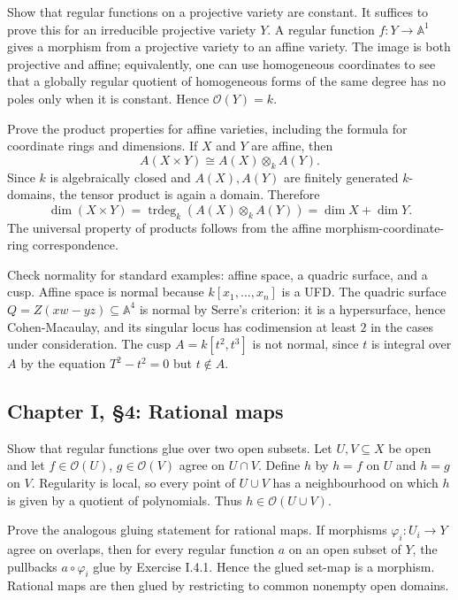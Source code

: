 \documentclass[12pt]{article}
\theoremstyle{plain}
\theoremstyle{definition}
\newcommand{\bb}[1]{\mathbb{#1}}
\begin{document}
\questionpar Show that regular functions on a projective variety are constant.
\solutionpar It suffices to prove this for an irreducible projective variety $Y$. A regular function $f:Y\to\bb A^1$ gives a morphism from a projective variety to an affine variety. The image is both projective and affine; equivalently, one can use homogeneous coordinates to see that a globally regular quotient of homogeneous forms of the same degree has no poles only when it is constant. Hence $\mathcal O(Y)=k$.

\questionpar Prove the product properties for affine varieties, including the formula for coordinate rings and dimensions.
\solutionpar If $X$ and $Y$ are affine, then
\[
A(X\times Y)\cong A(X)\otimes_k A(Y).
\]
Since $k$ is algebraically closed and $A(X),A(Y)$ are finitely generated $k$-domains, the tensor product is again a domain. Therefore
\[
\dim(X\times Y)=\operatorname{trdeg}_k(A(X)\otimes_k A(Y))=\dim X+
\dim Y.
\]
The universal property of products follows from the affine morphism-coordinate-ring correspondence.

\questionpar Check normality for standard examples: affine space, a quadric surface, and a cusp.
\solutionpar Affine space is normal because $k[x_1,\ldots,x_n]$ is a UFD. The quadric surface $Q=Z(xw-yz)\subseteq\bb A^4$ is normal by Serre's criterion: it is a hypersurface, hence Cohen-Macaulay, and its singular locus has codimension at least $2$ in the cases under consideration. The cusp $A=k[t^2,t^3]$ is not normal, since $t$ is integral over $A$ by the equation $T^2-t^2=0$ but $t\notin A$.

\subsection{Chapter I, \S 4: Rational maps}

\questionpar Show that regular functions glue over two open subsets.
\solutionpar Let $U,V\subseteq X$ be open and let $f\in\mathcal O(U)$, $g\in\mathcal O(V)$ agree on $U\cap V$. Define $h$ by $h=f$ on $U$ and $h=g$ on $V$. Regularity is local, so every point of $U\cup V$ has a neighbourhood on which $h$ is given by a quotient of polynomials. Thus $h\in\mathcal O(U\cup V)$.

\questionpar Prove the analogous gluing statement for rational maps.
\solutionpar If morphisms $\varphi_i:U_i\to Y$ agree on overlaps, then for every regular function $a$ on an open subset of $Y$, the pullbacks $a\circ\varphi_i$ glue by Exercise I.4.1. Hence the glued set-map is a morphism. Rational maps are then glued by restricting to common nonempty open domains.
\end{document}
